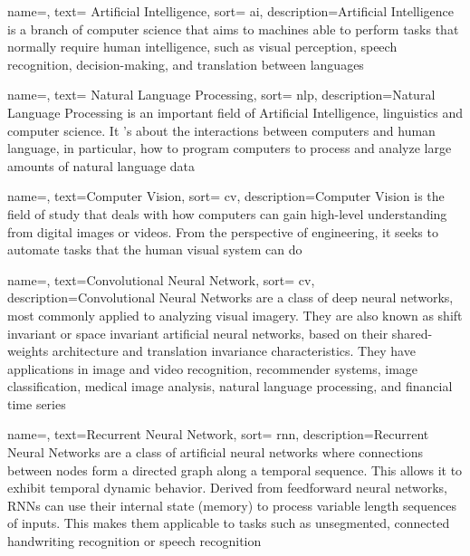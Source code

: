 \renewcommand{\acronymname}{Acronimi e abbreviazioni}

{
    name=,
    text= Artificial Intelligence,
    sort= ai,
    description={Artificial Intelligence is a branch of computer science that aims to machines able to perform tasks that normally require human intelligence, such as visual perception, speech recognition, decision-making, and translation between languages}
}


{
    name=,
    text= Natural Language Processing,
    sort= nlp,
    description={Natural Language Processing is an important field of Artificial Intelligence, linguistics and computer science. It 's about the interactions between computers and human language, in particular, how to program computers to process and analyze large amounts of natural language data}
}

{
    name=,
    text=Computer Vision,
    sort= cv,
    description={Computer Vision is the field of study that deals with how computers can gain high-level understanding from digital images or videos. From the perspective of engineering, it seeks to automate tasks that the human visual system can do}
}

{
    name=,
    text=Convolutional Neural Network,
    sort= cv,
    description={Convolutional Neural Networks are a class of deep neural networks, most commonly applied to analyzing visual imagery. They are also known as shift invariant or space invariant artificial neural networks, based on their shared-weights architecture and translation invariance characteristics. They have applications in image and video recognition, recommender systems, image classification, medical image analysis, natural language processing, and financial time series}
}

{
    name=,
    text=Recurrent Neural Network,
    sort= rnn,
    description={Recurrent Neural Networks are a class of artificial neural networks where connections between nodes form a directed graph along a temporal sequence. This allows it to exhibit temporal dynamic behavior. Derived from feedforward neural networks, RNNs can use their internal state (memory) to process variable length sequences of inputs. This makes them applicable to tasks such as unsegmented, connected handwriting recognition or speech recognition}
}

